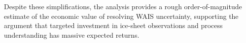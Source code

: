 \documentclass[12pt]{article}
\begin{document}
Despite these simplifications, the analysis provides a rough order-of-magnitude estimate of the economic value of resolving WAIS uncertainty, supporting the argument that targeted investment in ice-sheet observations and process understanding has massive expected returns.






\end{document}
